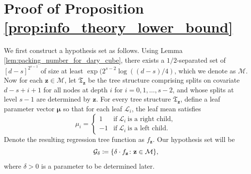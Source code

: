 \documentclass[11pt]{article}
\newcommand{\bz}{\mathbf{z}}
\newcommand{\bmu}{\boldsymbol{\mu}}
\DeclarePairedDelimiter{\braces}{\lbrace}{\rbrace}
\newcommand{\treespace}{\Omega}
\newcommand{\tree}{\mathfrak{T}}
\newcommand{\leaf}{\mathcal{L}}
\newcommand{\nfeats}{d}
\begin{document}
\section{Proof of Proposition \ref{prop:info_theory_lower_bound}}
\label{sec:info_theory_lower_bound}


    We first construct a hypothesis set as follows.
    Using Lemma \ref{lem:packing_number_for_dary_cube}, there exists a $1/2$-separated set of $[d-s]^{2^{s-1}}$ of size at least $\exp(2^{s-2}\log((d-s)/4)$, which we denote as $\mathcal{M}$.
    Now for each $\bz \in \mathcal{M}$, let $\tree_{\bz}$ be the tree structure comprising splits on covariate $d-s + i + 1$ for all nodes at depth $i$ for $i=0,1,\ldots,s-2$, and whose splits at level $s-1$ are determined by $\bz$.
    For every tree structure $\tree_{\bz}$, define a leaf parameter vector $\bmu$ so that for each leaf $\leaf_i$, the leaf mean satisfies
    \begin{equation}
        \mu_i = \begin{cases}
            1 & \text{if}~\leaf_i~\text{is a right child}, \\
            -1 & \text{if}~\leaf_i~\text{is a left child}.
        \end{cases}
    \end{equation}
    Denote the resulting regression tree function as $f_\bz$.
    Our hypothesis set will be
    \begin{equation}
        \mathcal{G}_\delta \coloneqq \braces*{\delta \cdot f_\bz \colon \bz \in \mathcal{M}},
    \end{equation}
    where $\delta > 0$ is a parameter to be determined later.
\end{document}
